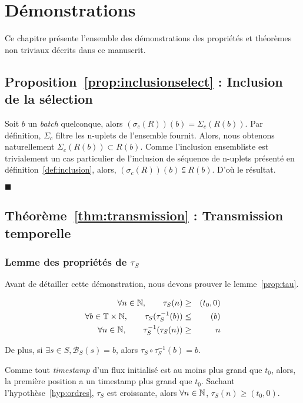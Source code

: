 \chapter{Démonstrations}\label{chap:misc:demo}
\chaptertoc

Ce chapitre présente l'ensemble des démonstrations des propriétés et théorèmes non triviaux décrits dans ce manuscrit.
\def\findemo{\begin{flushright} $\blacksquare$ \end{flushright}}
\section{Proposition~\ref{prop:inclusionselect} : Inclusion de la sélection}
Soit $b$ un \textit{batch} quelconque, alors $(\sigma_c(R))(b) = \Sigma_c(R(b))$. Par définition, $\Sigma_c$ filtre les n-uplets de l'ensemble fournit. Alors, nous obtenons naturellement $\Sigma_c(R(b)) \subset R(b)$. Comme l'inclusion ensembliste est trivialement un cas particulier de l'inclusion de séquence de n-uplets présenté en définition~\ref{def:inclusion}, alors, $(\sigma_c(R))(b) \subseteqq R(b)$. D'où le résultat.
\findemo

\section{Théorème~\ref{thm:transmission} : Transmission temporelle}
\subsection{Lemme des propriétés de $\tau_S$}
Avant de détailler cette démonstration, nous devons prouver le lemme~\ref{prop:tau}.

\begin{lem}\label{prop:tau}
\begin{eqnarray*}
   \forall n \in \mathbb{N}, \qquad \tau_S(n) &\geq&( t_0,0) \\
   \forall b\in \mathbb{T}\times\mathbb{N}, \qquad \tau_S(\tau_S^{-1}(b)) & \leq & (b)\\
	\forall n \in \mathbb{N}, \qquad \tau_S^{-1}(\tau_S(n)) &\geq & n
\end{eqnarray*}

De plus, si $\exists s \in S, \mathcal B_S(s)=b$, alors $\tau_S\circ\tau_S^{-1}(b) = b$.
\end{lem}

Comme tout \textit{timestamp} d'un flux initialisé est au moins plus grand que $t_0$, alors, la première position a un timestamp plus grand que $t_0$. Sachant l'hypothèse~\ref{hyp:ordres}, $\tau_S$ est croissante, alors $\forall n \in \mathbb{N}$, $\tau_S(n) \geq (t_0,0)$.

